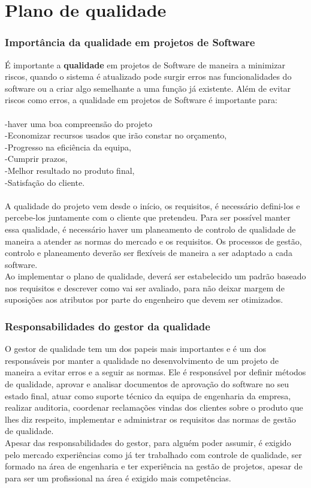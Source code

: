 \chapter{Plano de qualidade}
\label{plano_de_qualidade}

\subsection{Importância da qualidade em projetos de Software}
É importante a \textbf{qualidade} em projetos de Software de maneira a minimizar riscos, quando o sistema é atualizado pode surgir erros nas funcionalidades do software ou a criar algo semelhante a uma função já existente. Além de evitar riscos como erros, a qualidade em projetos de Software é importante para:\\
\\
-haver uma boa compreensão do projeto\\
-Economizar recursos usados que irão constar no orçamento,\\
-Progresso na eficiência da equipa,\\
-Cumprir prazos,\\
-Melhor resultado no produto final,\\
-Satisfação do cliente.\\
\\
A qualidade do projeto vem desde o início, os requisitos, é necessário defini-los e percebe-los juntamente com o cliente que pretendeu. Para ser possível manter essa qualidade, é necessário haver um planeamento de controlo de qualidade de maneira a atender as normas do mercado e os requisitos. Os processos de gestão, controlo e planeamento deverão ser flexíveis de maneira a ser adaptado a cada software.\\
Ao implementar o plano de qualidade, deverá ser estabelecido um padrão baseado nos requisitos e descrever como vai ser avaliado, para não deixar margem de suposições aos atributos por parte do engenheiro que devem ser otimizados.
\subsection{Responsabilidades do gestor da qualidade}
O gestor de qualidade tem um dos papeis mais importantes e é um dos responsáveis por manter a qualidade no desenvolvimento de um projeto de maneira a evitar erros e a seguir as normas. Ele é responsável por definir métodos de qualidade, aprovar e analisar documentos de aprovação do software no seu estado final, atuar como suporte técnico da equipa de engenharia da empresa, realizar auditoria, coordenar reclamações vindas dos clientes sobre o produto que lhes diz respeito, implementar e administrar os requisitos das normas de gestão de qualidade.\\
Apesar das responsabilidades do gestor, para alguém poder assumir, é exigido pelo mercado experiências como já ter trabalhado com controle de qualidade, ser formado na área de engenharia e ter experiência na gestão de projetos, apesar de para ser um profissional na área é exigido mais competências.

